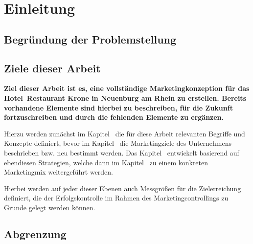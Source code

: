 \section{Einleitung}
\label{sec:einleitung}

\subsection{Begründung der Problemstellung}
\label{sec:problemstellung}


\subsection{Ziele dieser Arbeit}
\label{sec:zieledieserarbeit}

\textbf{Ziel dieser Arbeit ist es, eine vollständige Marketingkonzeption für das Hotel--Restaurant Krone in Neuenburg am Rhein zu erstellen. Bereits vorhandene Elemente sind hierbei zu beschreiben, für die Zukunft fortzuschreiben und durch die fehlenden Elemente zu ergänzen. }

Hierzu werden zunächst im Kapitel~ die für diese Arbeit relevanten Begriffe und Konzepte definiert, bevor im Kapitel~ die Marketingziele des Unternehmens beschrieben bzw. neu bestimmt werden. Das Kapitel~ entwickelt basierend auf ebendiesen Strategien, welche dann im Kapitel~ zu einem konkreten Marketingmix weitergeführt werden.

Hierbei werden auf jeder dieser Ebenen auch Messgrößen für die Zielerreichung definiert, die der Erfolgskontrolle im Rahmen des Marketingcontrollings zu Grunde gelegt werden können.

\subsection{Abgrenzung}
\label{sec:abgrenzung}









